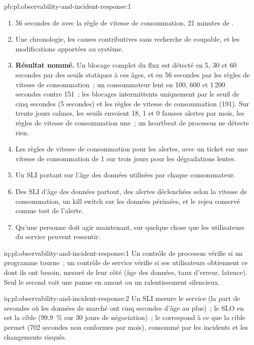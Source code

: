 \begin{solution}{pb:pl:observability-and-incident-response:1}
\begin{enumerate}
\item 56 secondes de  avec la règle de vitesse de consommation, 21 minutes de .
\item Une chronologie, les causes contributives sans recherche de coupable, et les modifications apportées au système.
\item \textbf{Résultat nommé.} Un blocage complet du flux est détecté en 5, 30 et 60 secondes par des seuils statiques à ces âges, et en 56 secondes par
les règles de vitesse de consommation~; un consommateur lent en 100, 600 et 1\,200 secondes contre 151~; les blocages intermittents uniquement par le seuil de cinq secondes (5
secondes) et les règles de vitesse de consommation (191). Sur trente jours calmes, les seuils envoient 18, 1 et 0 fausses alertes par mois, les règles de vitesse de consommation une~;
un heartbeat de processus ne détecte rien.
\item Les règles de vitesse de consommation pour les alertes, avec un ticket sur une vitesse de consommation de 1 sur trois jours pour les dégradations lentes.
\item Un SLI portant sur l'âge des données utilisées par chaque consommateur.
\item Des SLI d'âge des données partout, des alertes déclenchées selon la vitesse de consommation, un kill switch sur les données périmées, et le rejeu conservé comme test de l'alerte.
\item Qu'une personne doit agir maintenant, sur quelque chose que les utilisateurs du service peuvent ressentir.
\end{enumerate}
\end{solution}

\begin{solution}{iq:pl:observability-and-incident-response:1}
Un contrôle de processus vérifie si un programme tourne~; un contrôle de service vérifie si ses utilisateurs obtiennent ce dont ils ont besoin, mesuré de leur côté (âge des données,
taux d'erreur, latence). Seul le second voit une panne en amont ou un ralentissement silencieux.
\end{solution}

\begin{solution}{iq:pl:observability-and-incident-response:2}
Un SLI mesure le service (la part de secondes où les données de marché ont cinq secondes d'âge au plus)~; le SLO en est la cible (99.9~\% sur 30 jours
de négociation)~; le  correspond à ce que la cible permet (702 secondes non conformes par mois), consommé par les incidents et les changements risqués.
\end{solution}

